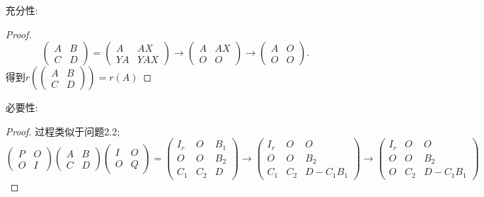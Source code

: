 \documentclass[11pt]{ctexart}
\theoremstyle{definition}
\numberwithin{equation}{section}
\begin{document}
    \begin{enumerate}
        \item [充分性:]\begin{proof}
            $$\begin{pmatrix}
                A&B\\C&D
            \end{pmatrix}=\begin{pmatrix}
                A&AX\\YA&YAX
            \end{pmatrix}\longrightarrow \begin{pmatrix}
                A&AX\\O&O
            \end{pmatrix}\longrightarrow \begin{pmatrix}
                A&O\\O&O
            \end{pmatrix}.$$得到$r(\begin{pmatrix}
        A&B\\C&D
    \end{pmatrix})=r(A)$
        \end{proof}
        \item [必要性:]\begin{proof}过程类似于问题2.2;
                $$\begin{pmatrix}
                    P&O\\O&I
                \end{pmatrix}\begin{pmatrix}
                    A&B\\C&D
                \end{pmatrix}\begin{pmatrix}
                    I&O\\O&Q
                \end{pmatrix}=\begin{pmatrix}
                    I_{r}&O&B_1\\O&O&B_2\\C_1&C_2&D
                \end{pmatrix}\longrightarrow \begin{pmatrix}
                    I_{r}&O&O\\O&O&B_2\\C_1&C_2&D-C_1B_1
                \end{pmatrix}\longrightarrow \begin{pmatrix}
                    I_{r}&O&O\\O&O&B_2\\O&C_2&D-C_1B_1

\end{pmatrix}$$
\end{proof}
\end{enumerate}
\end{document}
